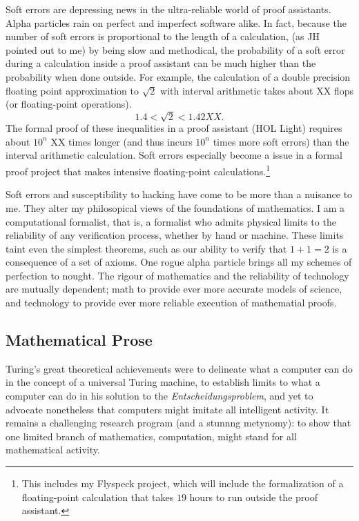 \documentclass{llncs}
\begin{document}
Soft errors are depressing news in the ultra-reliable world of proof
assistants.  Alpha particles rain on perfect and imperfect software alike.
In fact, because the number of soft errors is proportional to the length
of a calculation, (as JH pointed out to me) by being slow and methodical,
the probability of a soft error during a calculation inside
a proof assistant can be much higher than the probability when done outside.
For example, the calculation of a double precision 
floating point approximation to $\sqrt{2}$ with interval arithmetic
takes about XX flops (or floating-point operations).  
\begin{equation}
1.4 < \sqrt{2} < 1.42 XX.
\end{equation}
The formal proof of these inequalities in a proof assistant (HOL
Light) requires about $10^n$ XX times longer (and thus incurs $10^n$
times more soft errors) than the interval arithmetic calculation.
Soft errors especially become a issue in a formal proof project that
makes intensive floating-point calculations.\footnote{This includes my
  Flyspeck project, which will include the formalization of a
  floating-point calculation that takes $19$ hours to run outside the
  proof assistant.}

Soft errors and susceptibility to hacking
have come to be more than a nuisance to me.  They alter my
philosopical views of the foundations of mathematics.  I am a
computational formalist, that is, a formalist who admits physical
limits to the reliability of any verification process, whether by hand
or machine.  These limits taint even the simplest theorems, such as
our ability to verify that $1+1=2$ is a consequence of a set of
axioms.  One rogue alpha particle brings all my schemes of
perfection to nought.  %
The rigour of
mathematics and the reliability of technology are mutually dependent;
math to provide ever more accurate models of science, and technology
to provide ever more reliable execution of mathematial proofs.


\subsection{Mathematical Prose}

Turing's great theoretical achievements were to delineate what a
computer can do in the concept of a universal Turing machine, to
establish limits to what a computer can do in his solution to the {\it
  Entscheidungsproblem}, and yet to advocate nonetheless that
computers might imitate all intelligent activity. It remains a
challenging research program (and a stunnng metynomy): to show
that one limited branch of mathematics, computation, might stand for
all mathematical activity.
\end{document}
